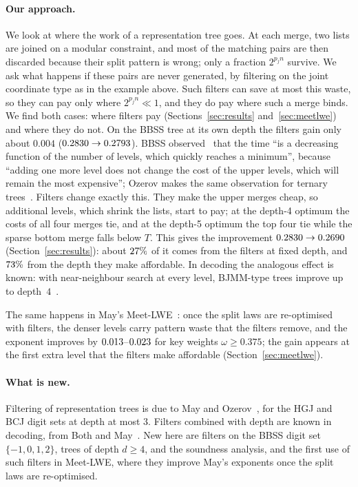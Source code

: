 \documentclass[11pt]{article}
\theoremstyle{definition}
\theoremstyle{remark}
\newif\ifincludemeetlwe \includemeetlwetrue  %
\begin{document}
\paragraph{Our approach.} We look at where the work of a representation tree goes. At each merge, two lists are
joined on a modular constraint, and most of the matching pairs are then discarded because their split pattern is
wrong; only a fraction $2^{p_jn}$ survive. We ask what happens if these pairs are never generated, by filtering on the
joint coordinate type as in the example above. Such filters can save at most this waste, so they can pay only where
$2^{p_jn}\ll1$, and they do pay where such a merge binds. We find both cases: where filters pay
(\ifincludemeetlwe Sections~\ref{sec:results} and~\ref{sec:meetlwe}\else Section~\ref{sec:results}\fi) and where they do not.
On the BBSS tree at its own depth
the filters gain only about $0.004$ ($0.2830\to0.2793$). BBSS observed~\cite[Remark~4]{BBSS20} that the time ``is a decreasing function of the number
of levels, which quickly reaches a minimum'', because ``adding one more level does not change the cost of the upper
levels, which will remain the most expensive''; Ozerov makes the same observation for ternary trees~\cite[\S4.1]{Oze16}.
Filters change exactly this. They make the upper merges cheap, so additional levels, which shrink the lists, start to
pay; at the depth-4 optimum the costs of all four merges tie, and at the depth-5 optimum the top four tie while
the sparse bottom merge falls below $T$. This gives the improvement
$0.2830\to0.2690$ (Section~\ref{sec:results}): about $27\%$ of it comes from the filters at fixed depth,
and $73\%$ from the depth they make affordable. In decoding the analogous effect is known: with
near-neighbour search at every level, BJMM-type trees improve up to depth~$4$~\cite{BM17b,BM18}.
\ifincludemeetlwe
The same happens in May's Meet-LWE~\cite{May21}: once the split laws are re-optimised with filters, the denser
levels carry pattern waste that the filters remove, and the exponent improves by $0.013$--$0.023$ for key
weights $\omega\ge0.375$; the gain appears at the first extra level that the filters make affordable (Section~\ref{sec:meetlwe}).
\fi

\paragraph{What is new.} Filtering of representation trees is due to May and Ozerov~\cite{Oze16}, for the HGJ and BCJ
digit sets at depth at most $3$. Filters combined with depth are known in decoding, from Both and May~\cite{BM17b,BM18}.
New here are filters on the BBSS digit set $\{-1,0,1,2\}$, trees of depth $d\ge4$, and the soundness
analysis\ifincludemeetlwe, and the first use of such filters in Meet-LWE, where they improve May's exponents once the
split laws are re-optimised\fi.
\end{document}
